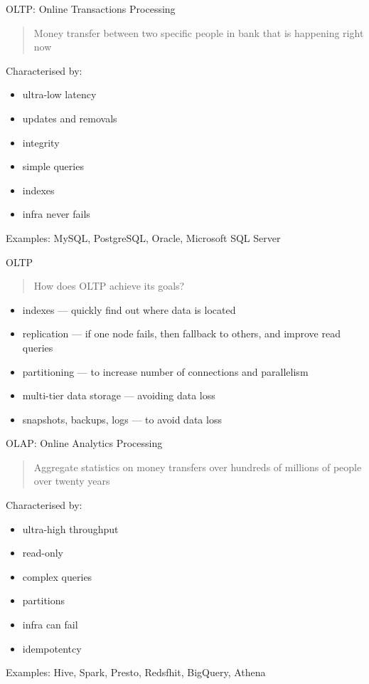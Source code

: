 \documentclass[t,pdf]{beamer}
\begin{document}
\begin{frame}{OLTP: Online Transactions Processing}
\begin{quote}
Money transfer between two specific people in bank that is happening right now
\end{quote}

Characterised by:
\begin{itemize}
   \item ultra-low latency
   \item updates and removals
   \item integrity
   \item simple queries
   \item indexes
   \item infra never fails
\end{itemize}

Examples: MySQL, PostgreSQL, Oracle, Microsoft SQL Server
\end{frame}

\begin{frame}{OLTP}
\begin{quote}
How does OLTP achieve its goals?
\end{quote}

\begin{itemize}
    \item indexes — quickly find out where data is located
    \item replication — if one node fails, then fallback to others, and improve read queries
    \item partitioning — to increase number of connections and parallelism
    \item multi-tier data storage — avoiding data loss
    \item snapshots, backups, logs — to avoid data loss
\end{itemize}

\end{frame}

\begin{frame}{OLAP: Online Analytics Processing}
\begin{quote}
Aggregate statistics on money transfers over hundreds of millions of people over twenty years
\end{quote}

Characterised by:
\begin{itemize}
    \item ultra-high throughput
    \item read-only
    \item complex queries
    \item partitions
    \item infra can fail
    \item idempotentcy
\end{itemize}

Examples: Hive, Spark, Presto, Redsfhit, BigQuery, Athena
\end{frame}
\end{document}
